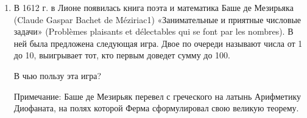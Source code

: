 \documentclass[12pt]{article}
\begin{document}
\begin{enumerate}
   \item В 1612 г. в Лионе появилась книга поэта и математика Баше де Мезирьяка (Claude Gaspar Bachet
   de Méziriac1) «Занимательные и приятные числовые задачи» (Problèmes plaisants et délectables qui
   se font par les nombres). В ней была предложена следующая игра. Двое по очереди называют числа
   от 1 до 10, выигрывает тот, кто первым доведет сумму до 100. 
   
   
   В чью пользу эта игра?
   
   Примечание: Баше де Мезирьяк перевел с греческого на латынь Арифметику Диофаната, 
   на полях которой Ферма сформулировал свою великую теорему.   

\end{enumerate}
\end{document}
